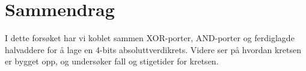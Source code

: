 \section*{Sammendrag}
I dette forsøket har vi koblet sammen XOR-porter, AND-porter og ferdiglagde halvaddere for å lage en 4-bits absoluttverdikrets.
Videre ser på hvordan kretsen er bygget opp, og undersøker fall og stigetider for kretsen.
